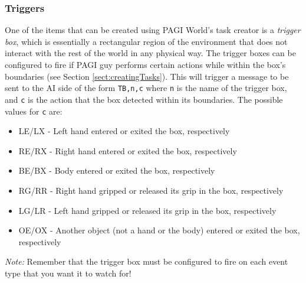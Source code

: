\subsubsection{Triggers}

One of the items that can be created using PAGI World's task creator is a \textit{trigger box}, which is essentially a rectangular region of the environment that does not interact with the rest of the world in any physical way. The trigger boxes can be configured to fire if PAGI guy performs certain actions while within the box's boundaries (see Section \ref{sect:creatingTasks}). This will trigger a message to be sent to the AI side of the form \texttt{TB,n,c} where \texttt{n} is the name of the trigger box, and \texttt{c} is the action that the box detected within its boundaries. The possible values for \texttt{c} are:

\begin{itemize}
\item{LE/LX} - Left hand entered or exited the box, respectively
\item{RE/RX} - Right hand entered or exited the box, respectively
\item{BE/BX} - Body entered or exited the box, respectively
\item{RG/RR} - Right hand gripped or released its grip in the box, respectively
\item{LG/LR} - Left hand gripped or released its grip in the box, respectively
\item{OE/OX} - Another object (not a hand or the body) entered or exited the box, respectively
\end{itemize}

\textit{Note:} Remember that the trigger box must be configured to fire on each event type that you want it to watch for!
	
